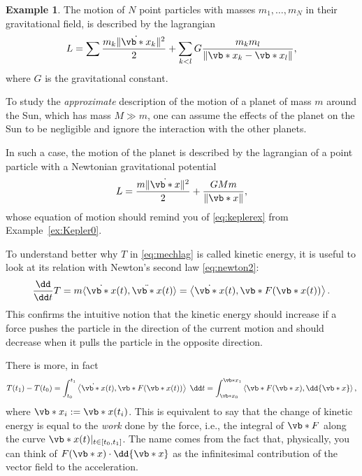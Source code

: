 \documentclass[english,fontsize=11pt,paper=b5]{scrbook}
\theoremstyle{definition}
\newtheorem{example}{Example}[chapter]
\begin{document}
    \begin{example}\label{ex:kepler1}
      The motion of $N$ point particles with masses $m_1, \ldots, m_N$ in their gravitational field, is described by the lagrangian
      \begin{equation}
        L = \sum\frac{m_k \|\dot{\vb*{x}}_k\|^2}{2} + \sum_{k < l} G \frac{m_k m_l}{\|\vb*{x}_k - \vb*{x}_l\|},
      \end{equation}
      where $G$ is the gravitational constant.

      To study the \emph{approximate} description of the motion of a planet of mass $m$ around the Sun, which has mass $M \gg m$, one can assume the effects of the planet on the Sun to be negligible and ignore the interaction with the other planets.

      In such a case, the motion of the planet is described by the lagrangian of a point particle with a Newtonian gravitational potential
      \begin{equation}
        L = \frac{m\|\dot{\vb*{x}}\|^2}{2} + \frac{G M m}{\|\vb*{x}\|},
      \end{equation}
      whose equation of motion should remind you of \eqref{eq:keplerex} from Example~\ref{ex:Kepler0}.
    \end{example}

    To understand better why $T$ in \eqref{eq:mechlag} is called kinetic energy, it is useful to look at its relation with Newton's second law \eqref{eq:newton2}:
    \begin{equation}
      \frac{\dd}{\dd t} T
      = m \langle\dot{\vb*{x}}(t), \ddot{\vb*{x}}(t)\rangle
      = \left\langle\dot{\vb*{x}}(t), \vb*{F}(\vb*{x}(t))\right\rangle.
    \end{equation}
    This confirms the intuitive notion that the kinetic energy should increase if a force pushes the particle in the direction of the current motion and should decrease when it pulls the particle in the opposite direction.

    There is more, in fact
    \begin{equation}
      T(t_1) - T(t_0) = \int_{t_0}^{t_1} \left\langle\dot{\vb*{x}}(t), \vb*{F}(\vb*{x}(t))\right\rangle\; \dd t = \int_{\vb*{x}_0}^{\vb*{x}_1} \left\langle\vb*{F}(\vb*{x}), \dd{\vb*{x}}\right\rangle,
    \end{equation}
    where $\vb*{x}_i := \vb*{x}(t_i)$.
    This is equivalent to say that the change of kinetic energy is equal to the \emph{work} done by the force, i.e., the integral of $\vb*{F}$ along the curve $\vb*{x}(t)|_{t\in[t_0, t_1]}$. The name comes from the fact that, physically, you can think of $F(\vb*{x}) \cdot \dd{\vb*{x}}$ as the infinitesimal contribution of the vector field to the acceleration.
\end{document}
